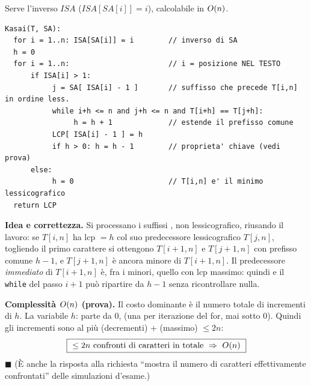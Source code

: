 Serve l'inverso $\mathit{ISA}$ ($\mathit{ISA}[\mathit{SA}[i]]=i$), calcolabile in $O\!\left(n\right)$.

\begin{verbatim}
Kasai(T, SA):
  for i = 1..n: ISA[SA[i]] = i        // inverso di SA
  h = 0
  for i = 1..n:                       // i = posizione NEL TESTO
      if ISA[i] > 1:
           j = SA[ ISA[i] - 1 ]       // suffisso che precede T[i,n] in ordine less.
           while i+h <= n and j+h <= n and T[i+h] == T[j+h]:
                h = h + 1             // estende il prefisso comune
           LCP[ ISA[i] - 1 ] = h
           if h > 0: h = h - 1        // proprieta' chiave (vedi prova)
      else:
           h = 0                      // T[i,n] e' il minimo lessicografico
  return LCP
\end{verbatim}

\textbf{Idea e correttezza.} Si processano i suffissi , non
lessicografico, riusando il lavoro: se $T[i,n]$ ha lcp $=h$ col suo predecessore lessicografico
$T[j,n]$, togliendo il primo carattere si ottengono $T[i+1,n]$ e $T[j+1,n]$ con prefisso comune
$h-1$, e $T[j+1,n]$ \`e ancora minore di $T[i+1,n]$. Il predecessore \emph{immediato} di
$T[i+1,n]$ \`e, fra i minori, quello con lcp massimo: quindi  e il
\texttt{while} del passo $i+1$ pu\`o ripartire da $h-1$ senza ricontrollare nulla.

\textbf{Complessit\`a $O\!\left(n\right)$ (prova).} Il costo dominante \`e il numero totale di incrementi di
$h$. La variabile $h$: parte da 0,  (una per iterazione del for, mai sotto 0). Quindi gli incrementi sono al pi\`u
(decrementi) $+$ (massimo) $\le 2n$:
\[
\boxed{\ \le 2n\ \text{confronti di caratteri in totale}\ \Rightarrow\ O\!\left(n\right)\ }
\]
$\blacksquare$ (\`E anche la risposta alla richiesta ``mostra il numero di caratteri
effettivamente confrontati'' delle simulazioni d'esame.)
